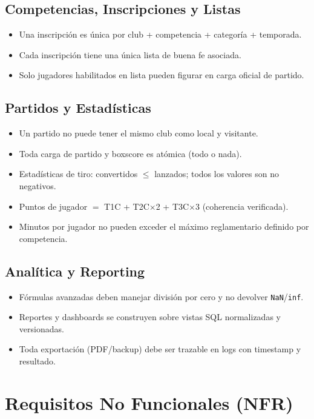 \documentclass[11pt,a4paper]{article}
\begin{document}
\subsection*{Competencias, Inscripciones y Listas}
\begin{itemize}[nosep]
  \item Una inscripción es única por club + competencia + categoría + temporada.
  \item Cada inscripción tiene una única lista de buena fe asociada.
  \item Solo jugadores habilitados en lista pueden figurar en carga oficial de partido.
\end{itemize}

\subsection*{Partidos y Estadísticas}
\begin{itemize}[nosep]
  \item Un partido no puede tener el mismo club como local y visitante.
  \item Toda carga de partido y boxscore es atómica (todo o nada).
  \item Estadísticas de tiro: convertidos $\leq$ lanzados; todos los valores son no negativos.
  \item Puntos de jugador $=$ T1C + T2C$\times$2 + T3C$\times$3 (coherencia verificada).
  \item Minutos por jugador no pueden exceder el máximo reglamentario definido por competencia.
\end{itemize}

\subsection*{Analítica y Reporting}
\begin{itemize}[nosep]
  \item Fórmulas avanzadas deben manejar división por cero y no devolver \texttt{NaN}/\texttt{inf}.
  \item Reportes y dashboards se construyen sobre vistas SQL normalizadas y versionadas.
  \item Toda exportación (PDF/backup) debe ser trazable en logs con timestamp y resultado.
\end{itemize}

\section{Requisitos No Funcionales (NFR)}
\end{document}

